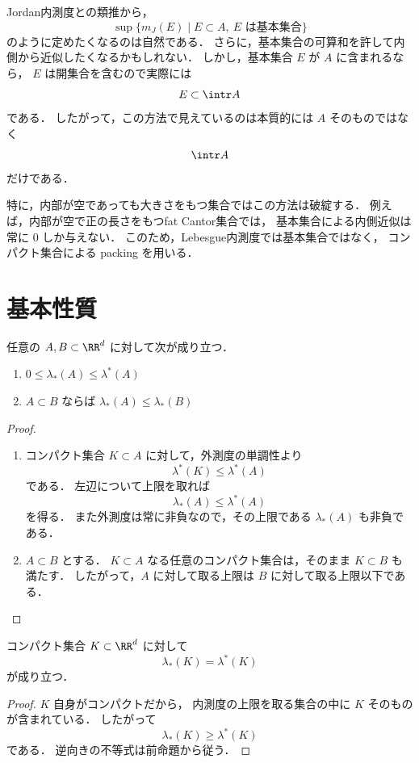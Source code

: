 \begin{remark}[基本集合による内側近似がうまくいかない理由]
Jordan内測度との類推から，
\[
\sup\{m_J(E)\mid E \subset A,\ E \text{ は基本集合}\}
\]
のように定めたくなるのは自然である．
さらに，基本集合の可算和を許して内側から近似したくなるかもしれない．
しかし，基本集合 $E$ が $A$ に含まれるなら，
$E$ は開集合を含むので実際には
\[
E \subset \intr A
\]
である．
したがって，この方法で見えているのは本質的には $A$ そのものではなく
\[
\intr A
\]
だけである．

特に，内部が空であっても大きさをもつ集合ではこの方法は破綻する．
例えば，内部が空で正の長さをもつfat Cantor集合では，
基本集合による内側近似は常に $0$ しか与えない．
このため，Lebesgue内測度では基本集合ではなく，
コンパクト集合による packing を用いる．
\end{remark}

\section{基本性質}

\begin{proposition}
任意の $A,B \subset \RR^d$ に対して次が成り立つ．
\begin{enumerate}
    \item $0 \le \lambda_*(A) \le \lambda^*(A)$
    \item $A \subset B$ ならば $\lambda_*(A) \le \lambda_*(B)$
\end{enumerate}
\end{proposition}
\begin{proof}
\begin{enumerate}
    \item コンパクト集合 $K \subset A$ に対して，外測度の単調性より
    \[
    \lambda^*(K) \le \lambda^*(A)
    \]
    である．
    左辺について上限を取れば
    \[
    \lambda_*(A) \le \lambda^*(A)
    \]
    を得る．
    また外測度は常に非負なので，その上限である $\lambda_*(A)$ も非負である．

    \item $A \subset B$ とする．
    $K \subset A$ なる任意のコンパクト集合は，そのまま $K \subset B$ も満たす．
    したがって，$A$ に対して取る上限は $B$ に対して取る上限以下である．
\end{enumerate}
\end{proof}

\begin{proposition}[コンパクト集合では内外が一致する]
コンパクト集合 $K \subset \RR^d$ に対して
\[
\lambda_*(K)=\lambda^*(K)
\]
が成り立つ．
\end{proposition}
\begin{proof}
$K$ 自身がコンパクトだから，
内測度の上限を取る集合の中に $K$ そのものが含まれている．
したがって
\[
\lambda_*(K) \ge \lambda^*(K)
\]
である．
逆向きの不等式は前命題から従う．
\end{proof}

